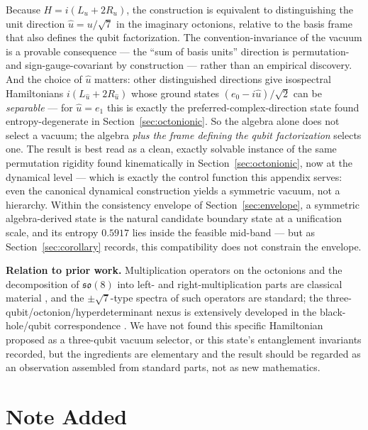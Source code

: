 \documentclass[11pt]{article}
\begin{document}
Because $H = i(L_u + 2R_u)$, the construction is equivalent to distinguishing the unit direction $\hat{u} = u/\sqrt{7}$ in the imaginary octonions, relative to the basis frame that also defines the qubit factorization. The convention-invariance of the vacuum is a provable consequence --- the ``sum of basis units'' direction is permutation- and sign-gauge-covariant by construction --- rather than an empirical discovery. And the choice of $\hat{u}$ matters: other distinguished directions give isospectral Hamiltonians $i(L_{\hat{u}} + 2R_{\hat{u}})$ whose ground states $(e_0 - i\hat{u})/\sqrt{2}$ can be \emph{separable} --- for $\hat{u} = e_1$ this is exactly the preferred-complex-direction state found entropy-degenerate in Section~\ref{sec:octonionic}. So the algebra alone does not select a vacuum; the algebra \emph{plus the frame defining the qubit factorization} selects one. The result is best read as a clean, exactly solvable instance of the same permutation rigidity found kinematically in Section~\ref{sec:octonionic}, now at the dynamical level --- which is exactly the control function this appendix serves: even the canonical dynamical construction yields a symmetric vacuum, not a hierarchy. Within the consistency envelope of Section~\ref{sec:envelope}, a symmetric algebra-derived state is the natural candidate boundary state at a unification scale, and its entropy $0.5917$ lies inside the feasible mid-band --- but as Section~\ref{sec:corollary} records, this compatibility does not constrain the envelope.

\textbf{Relation to prior work.} Multiplication operators on the octonions and the decomposition of $\mathfrak{so}(8)$ into left- and right-multiplication parts are classical material \cite{harvey}, and the $\pm\sqrt{7}$-type spectra of such operators are standard; the three-qubit/octonion/hyperdeterminant nexus is extensively developed in the black-hole/qubit correspondence \cite{borsten}. We have not found this specific Hamiltonian proposed as a three-qubit vacuum selector, or this state's entanglement invariants recorded, but the ingredients are elementary and the result should be regarded as an observation assembled from standard parts, not as new mathematics.

\section*{Note Added}
\end{document}
